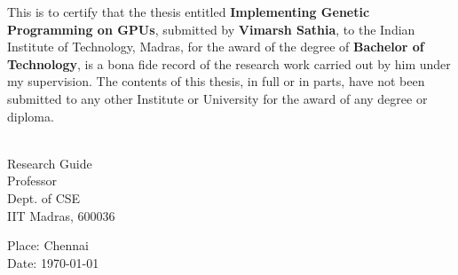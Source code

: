 \certificate

\vspace*{0.5in}

\noindent This is to certify that the thesis entitled {\bf Implementing Genetic Programming on GPUs}, 
submitted by {\bf Vimarsh Sathia}, to the Indian Institute of Technology, 
Madras, for the award of the degree of {\bf Bachelor of Technology}, 
is a bona fide record of the research work carried out by him under my
supervision. The contents of this thesis, in full or in parts, have not been
submitted to any other Institute or University for the award of any degree or
diploma.

\vspace*{1.4in}
\hspace*{-0.25in}
\begin{singlespacing}
	\hspace*{-0.25in}
	\parbox{2.5in}{
		 \\
		\noindent Research Guide \\ 
		\noindent Professor \\
		\noindent Dept. of CSE\\
		\noindent IIT Madras, 600036 \\
	} 
	\hspace*{1.0in} 
\end{singlespacing}
\vspace*{0.25in}
\noindent Place: Chennai\\
Date: \today